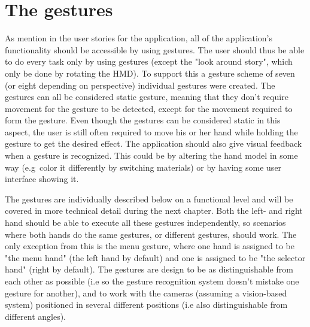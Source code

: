 \section{The gestures}
\label{sec:gesture_design}
As mention in the user stories for the application, all of the application's functionality should be accessible by using gestures. The user should thus
be able to do every task only by using gestures (except the "look around story", which only be done by rotating the HMD). To support this a gesture scheme of seven (or eight depending
on perspective) individual gestures were created. The gestures can all be considered static gesture, meaning that they don't require movement for the gesture to be detected, 
except for the movement required to form the gesture. 
Even though the gestures can be considered static in this aspect, the user is still often required to move his or her hand while holding the gesture to get the desired effect. 
The application should also give visual feedback when a gesture is recognized. This could be by altering the hand model in some way (e.g~color it differently by
switching materials) or by having some user interface showing it. 


The gestures are individually described below on a functional level and will be covered in more technical detail during the next chapter. 
Both the left- and right hand should be able to execute all these gestures independently, so scenarios where both hands do the same gestures, or different gestures, should
work. The only exception from this is the menu gesture, where one hand is assigned to be "the menu hand" (the left hand by default) and one is assigned to be "the selector hand"
(right by default). The gestures are design to be as distinguishable from each other as possible (i.e so the gesture recognition system doesn't mistake one gesture for
another), and to work with the cameras (assuming a vision-based system) positioned in several different positions (i.e also distinguishable from different angles).

 
